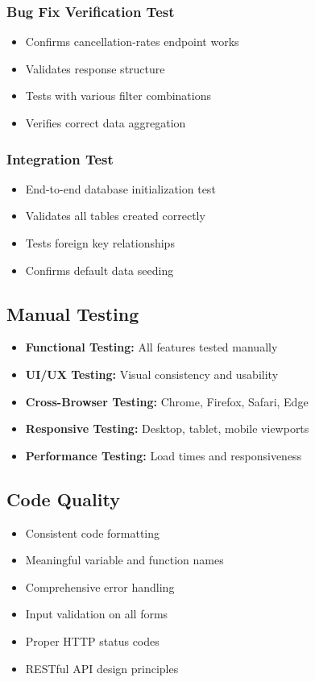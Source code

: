 \documentclass[12pt,a4paper]{article}
\begin{document}
\subsubsection{Bug Fix Verification Test}
\begin{itemize}[leftmargin=*]
    \item Confirms cancellation-rates endpoint works
    \item Validates response structure
    \item Tests with various filter combinations
    \item Verifies correct data aggregation
\end{itemize}

\subsubsection{Integration Test}
\begin{itemize}[leftmargin=*]
    \item End-to-end database initialization test
    \item Validates all tables created correctly
    \item Tests foreign key relationships
    \item Confirms default data seeding
\end{itemize}

\subsection{Manual Testing}

\begin{itemize}[leftmargin=*]
    \item \textbf{Functional Testing:} All features tested manually
    \item \textbf{UI/UX Testing:} Visual consistency and usability
    \item \textbf{Cross-Browser Testing:} Chrome, Firefox, Safari, Edge
    \item \textbf{Responsive Testing:} Desktop, tablet, mobile viewports
    \item \textbf{Performance Testing:} Load times and responsiveness
\end{itemize}

\subsection{Code Quality}

\begin{itemize}[leftmargin=*]
    \item Consistent code formatting
    \item Meaningful variable and function names
    \item Comprehensive error handling
    \item Input validation on all forms
    \item Proper HTTP status codes
    \item RESTful API design principles
\end{itemize}
\end{document}
